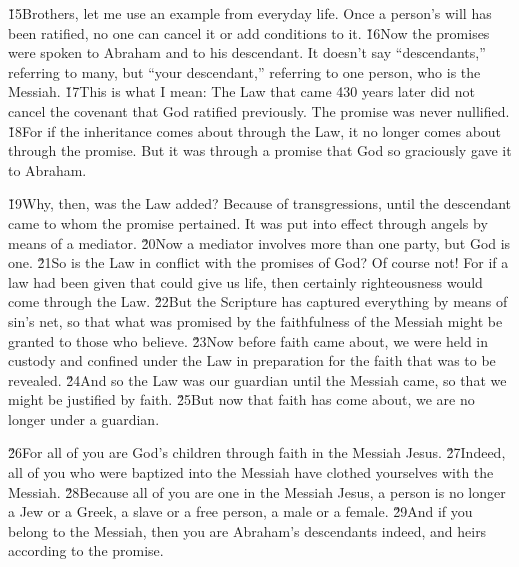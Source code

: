 \v{15}Brothers, let me use an example from everyday life. Once a person's will has been ratified, no one can cancel it or add conditions to it. \v{16}Now the promises were spoken to Abraham and to his descendant. It doesn't say ``descendants,'' referring to many, but ``your descendant,'' referring to one person, who is the Messiah. \v{17}This is what I mean: The Law that came 430 years later did not cancel the covenant that God ratified previously. The promise was never nullified. \v{18}For if the inheritance comes about through the Law, it no longer comes about through the promise. But it was through a promise that God so graciously gave it to Abraham.

\v{19}Why, then, was the Law added? Because of transgressions, until the descendant came to whom the promise pertained. It was put into effect through angels by means of a mediator. \v{20}Now a mediator involves more than one party, but God is one. \v{21}So is the Law in conflict with the promises of God? Of course not! For if a law had been given that could give us life, then certainly righteousness would come through the Law. \v{22}But the Scripture has captured everything by means of sin's net, so that what was promised by the faithfulness of the Messiah might be granted to those who believe. \v{23}Now before faith came about, we were held in custody and confined under the Law in preparation for the faith that was to be revealed. \v{24}And so the Law was our guardian until the Messiah came, so that we might be justified by faith. \v{25}But now that faith has come about, we are no longer under a guardian.

\v{26}For all of you are God's children through faith in the Messiah Jesus. \v{27}Indeed, all of you who were baptized into the Messiah have clothed yourselves with the Messiah. \v{28}Because all of you are one in the Messiah Jesus, a person is no longer a Jew or a Greek, a slave or a free person, a male or a female. \v{29}And if you belong to the Messiah, then you are Abraham's descendants indeed, and heirs according to the promise.


